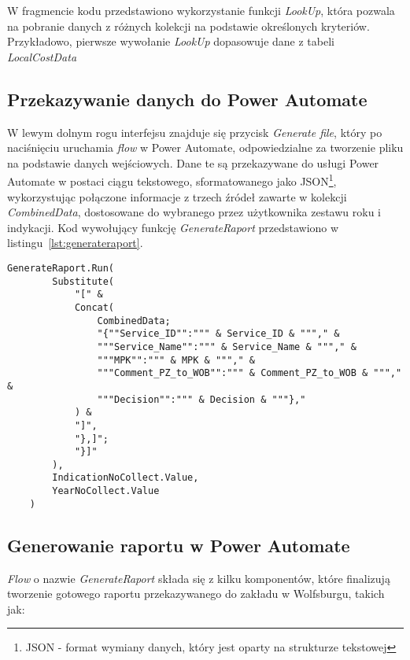 W fragmencie kodu przedstawiono wykorzystanie funkcji \textit{LookUp}, która pozwala na pobranie danych z różnych kolekcji na podstawie określonych kryteriów. Przykładowo, pierwsze wywołanie \textit{LookUp} dopasowuje dane z tabeli \textit{LocalCostData}

\subsection{Przekazywanie danych do Power Automate}

W lewym dolnym rogu interfejsu znajduje się przycisk \textit{Generate file}, który po naciśnięciu uruchamia \textit{flow} w Power Automate, odpowiedzialne za tworzenie pliku na podstawie danych wejściowych. Dane te są przekazywane do usługi Power Automate w postaci ciągu tekstowego, sformatowanego jako JSON\footnote{JSON - format wymiany danych, który jest oparty na strukturze tekstowej}, wykorzystując połączone informacje z trzech źródeł zawarte w kolekcji \textit{CombinedData}, dostosowane do wybranego przez użytkownika zestawu roku i indykacji. Kod wywołujący funkcję \textit{GenerateRaport} przedstawiono w listingu~\ref{lst:generateraport}.



\begin{lstlisting}[language=PowerFx, caption={Kod wywołujący funkcję GenerateRaport}, label={lst:generateraport}]
    GenerateRaport.Run(
        Substitute(
            "[" & 
            Concat(
                CombinedData;
                "{""Service_ID"":""" & Service_ID & """," &
                """Service_Name"":""" & Service_Name & """," &
                """MPK"":""" & MPK & """," &
                """Comment_PZ_to_WOB"":""" & Comment_PZ_to_WOB & """," &
                """Decision"":""" & Decision & """},"
            ) & 
            "]",
            "},]"; 
            "}]"
        ),
        IndicationNoCollect.Value,
        YearNoCollect.Value
    )
    \end{lstlisting}



\subsection{Generowanie raportu w Power Automate}


\emph{Flow} o nazwie \emph{GenerateRaport} składa się z kilku komponentów, które finalizują tworzenie gotowego raportu przekazywanego do zakładu w Wolfsburgu, takich jak:

